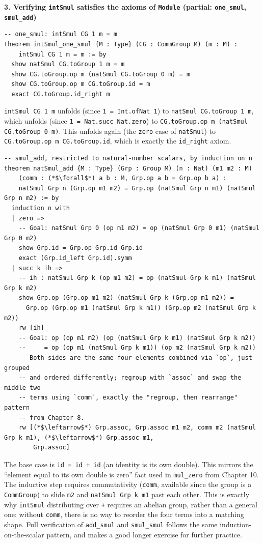 \textbf{3. Verifying \texttt{intSmul} satisfies the axioms of \texttt{Module} (partial: \texttt{one\_\allowbreak{}smul}, \texttt{smul\_\allowbreak{}add})}

\begin{lstlisting}
-- one_smul: intSmul CG 1 m = m
theorem intSmul_one_smul {M : Type} (CG : CommGroup M) (m : M) :
    intSmul CG 1 m = m := by
  show natSmul CG.toGroup 1 m = m
  show CG.toGroup.op m (natSmul CG.toGroup 0 m) = m
  show CG.toGroup.op m CG.toGroup.id = m
  exact CG.toGroup.id_right m
\end{lstlisting}

\texttt{intSmul CG 1 m} unfolds (since \texttt{1 = Int.ofNat 1}) to \texttt{natSmul CG.toGroup 1 m}, which unfolds (since \texttt{1 = Nat.succ Nat.zero}) to \texttt{CG.toGroup.op m (natSmul CG.toGroup 0 m)}. This unfolds again (the \texttt{zero} case of \texttt{natSmul}) to \texttt{CG.toGroup.op m CG.toGroup.id}, which is exactly the \texttt{id\_\allowbreak{}right} axiom.

\begin{lstlisting}
-- smul_add, restricted to natural-number scalars, by induction on n
theorem natSmul_add {M : Type} (Grp : Group M) (n : Nat) (m1 m2 : M)
    (comm : (*$\forall$*) a b : M, Grp.op a b = Grp.op b a) :
    natSmul Grp n (Grp.op m1 m2) = Grp.op (natSmul Grp n m1) (natSmul Grp n m2) := by
  induction n with
  | zero =>
    -- Goal: natSmul Grp 0 (op m1 m2) = op (natSmul Grp 0 m1) (natSmul Grp 0 m2)
    show Grp.id = Grp.op Grp.id Grp.id
    exact (Grp.id_left Grp.id).symm
  | succ k ih =>
    -- ih : natSmul Grp k (op m1 m2) = op (natSmul Grp k m1) (natSmul Grp k m2)
    show Grp.op (Grp.op m1 m2) (natSmul Grp k (Grp.op m1 m2)) =
      Grp.op (Grp.op m1 (natSmul Grp k m1)) (Grp.op m2 (natSmul Grp k m2))
    rw [ih]
    -- Goal: op (op m1 m2) (op (natSmul Grp k m1) (natSmul Grp k m2))
    --     = op (op m1 (natSmul Grp k m1)) (op m2 (natSmul Grp k m2))
    -- Both sides are the same four elements combined via `op`, just grouped
    -- and ordered differently; regroup with `assoc` and swap the middle two
    -- terms using `comm`, exactly the "regroup, then rearrange" pattern
    -- from Chapter 8.
    rw [(*$\leftarrow$*) Grp.assoc, Grp.assoc m1 m2, comm m2 (natSmul Grp k m1), (*$\leftarrow$*) Grp.assoc m1,
        Grp.assoc]
\end{lstlisting}

The base case is \texttt{id = id + id} (an identity is its own double). This mirrors the ``element equal to its own double is zero'' fact used in \texttt{mul\_\allowbreak{}zero} from Chapter 10. The inductive step requires commutativity (\texttt{comm}, available since the group is a \texttt{CommGroup}) to slide \texttt{m2} and \texttt{natSmul Grp k m1} past each other. This is exactly why \texttt{intSmul} distributing over \texttt{+} requires an abelian group, rather than a general one: without \texttt{comm}, there is no way to reorder the four terms into a matching shape. Full verification of \texttt{add\_\allowbreak{}smul} and \texttt{smul\_\allowbreak{}smul} follows the same induction-on-the-scalar pattern, and makes a good longer exercise for further practice.

